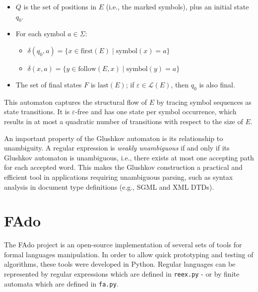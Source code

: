 \begin{itemize}
    \item $Q$ is the set of positions in $E$ (i.e., the marked symbols), plus an initial state $q_0$.
    \item For each symbol $a \in \Sigma$:
    \begin{itemize}
        \item $\delta(q_0, a) = \{ x \in \text{first}(E) \mid \text{symbol}(x) = a \}$
        \item $\delta(x, a) = \{ y \in \text{follow}(E, x) \mid \text{symbol}(y) = a \}$
    \end{itemize}
    \item The set of final states $F$ is $\text{last}(E)$; if $\varepsilon \in \mathcal{L}(E)$, then $q_0$ is also final.
\end{itemize}

This automaton captures the structural flow of $E$ by tracing symbol sequences as state transitions. It is $\varepsilon$-free and has one state per symbol occurrence, which results in at most a quadratic number of transitions with respect to the size of $E$.

An important property of the Glushkov automaton is its relationship to unambiguity. A regular expression is \emph{weakly unambiguous} if and only if its Glushkov automaton is unambiguous, i.e., there exists at most one accepting path for each accepted word. This makes the Glushkov construction a practical and efficient tool in applications requiring unambiguous parsing, such as syntax analysis in document type definitions (e.g., SGML and XML DTDs).





\section{FAdo}
The FAdo \cite{fado_paper} project is an open-source implementation of several sets of tools for formal languages manipulation. In order to allow quick prototyping and testing of algorithms, these tools were developed in Python. Regular languages can be represented by regular expressions which are defined in \texttt{reex.py} - or by finite automata which are defined in \texttt{fa.py}.

